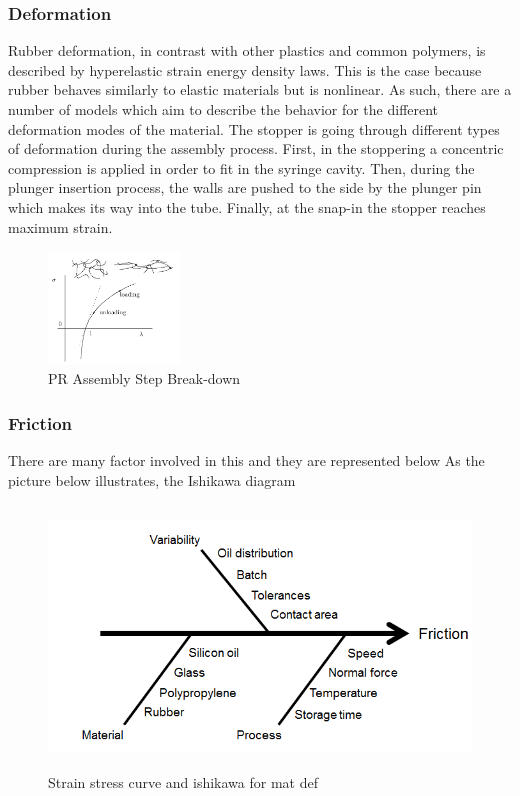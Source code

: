 \subsubsection{Deformation}
Rubber deformation, in contrast with other plastics and common polymers, is described by hyperelastic strain energy density laws. This is the case because rubber behaves similarly to elastic materials but is nonlinear. As such, there are a number of models which aim to describe the behavior for the different deformation modes of the material.
The stopper is going through different types of deformation during the assembly process. First, in the stoppering a concentric compression is applied in order to fit in the syringe cavity. Then, during the plunger insertion process, the walls are pushed to the side by the plunger pin which makes its way into the tube. Finally, at the snap-in the stopper reaches maximum strain.
\begin{figure}[h!]	
	\centering
\includegraphics[height=3cm]{img/strainstress.PNG}
   \caption{PR Assembly Step Break-down}
 \label{fgr:PFS}
\end{figure}

\newpage
\subsubsection{Friction}
 There are many factor involved in this and they are represented below
As the picture below illustrates, the Ishikawa diagram
\begin{figure}[h!]	
	\centering
\includegraphics[height=7cm]{img/ishi.PNG}
   \caption{Strain stress curve and ishikawa for mat def}
 \label{fgr:PFS}
\end{figure}

